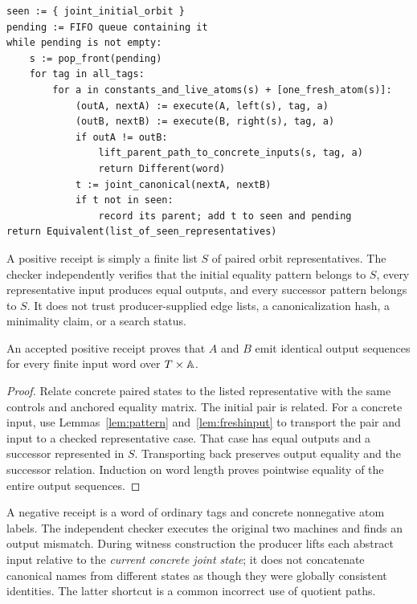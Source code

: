 \begin{lstlisting}
seen := { joint_initial_orbit }
pending := FIFO queue containing it
while pending is not empty:
    s := pop_front(pending)
    for tag in all_tags:
        for a in constants_and_live_atoms(s) + [one_fresh_atom(s)]:
            (outA, nextA) := execute(A, left(s), tag, a)
            (outB, nextB) := execute(B, right(s), tag, a)
            if outA != outB:
                lift_parent_path_to_concrete_inputs(s, tag, a)
                return Different(word)
            t := joint_canonical(nextA, nextB)
            if t not in seen:
                record its parent; add t to seen and pending
return Equivalent(list_of_seen_representatives)
\end{lstlisting}

A positive receipt is simply a finite list $S$ of paired orbit representatives.
The checker independently verifies that the initial equality pattern belongs
to $S$, every representative input produces equal outputs, and every successor
pattern belongs to $S$. It does not trust producer-supplied edge lists, a
canonicalization hash, a minimality claim, or a search status.

\begin{theorem}
\label{thm:orbitsound}
An accepted positive receipt proves that $A$ and $B$ emit identical output
sequences for every finite input word over $T\times\mathbb A$.
\end{theorem}
\begin{proof}
Relate concrete paired states to the listed representative with the same
controls and anchored equality matrix. The initial pair is related. For a
concrete input, use Lemmas~\ref{lem:pattern} and~\ref{lem:freshinput} to
transport the pair and input to a checked representative case. That case has
equal outputs and a successor represented in $S$. Transporting back preserves
output equality and the successor relation. Induction on word length proves
pointwise equality of the entire output sequences.
\end{proof}

A negative receipt is a word of ordinary tags and concrete nonnegative atom
labels. The independent checker executes the original two machines and finds
an output mismatch. During witness construction the producer lifts each
abstract input relative to the \emph{current concrete joint state}; it does not
concatenate canonical names from different states as though they were globally
consistent identities. The latter shortcut is a common incorrect use of
quotient paths.

